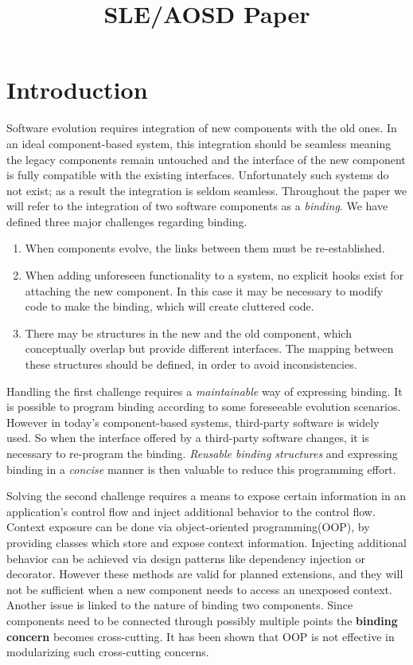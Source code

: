 \documentclass{llncs}
\begin{document}
\title{SLE/AOSD Paper}
\maketitle
\section{Introduction}
Software evolution requires integration of new components with the old ones. In an
ideal component-based system, this integration should be seamless meaning 
 the legacy components remain untouched and the interface of the new component is fully compatible with the existing interfaces. 
Unfortunately such systems do not exist; as a result the integration is seldom
seamless.  Throughout the paper we will refer to the integration of two software components as a
\emph{binding}. We have defined three major challenges regarding binding. 

\begin{enumerate}
  	\item When components evolve, the links between them
	must be re-established. 
 	 \item When adding unforeseen functionality to a system, no explicit hooks
 	 exist for attaching the new component. In this case it may be necessary
  	to modify code to make the binding, which will create cluttered code. 
	\item There may be structures in the new and the old component, which
	conceptually overlap but provide different interfaces. 	The mapping between
	these structures should be defined, in order to avoid inconsistencies.
\end{enumerate}

Handling the first challenge requires a \emph{maintainable} way of expressing binding. It is possible to program binding according to some foreseeable evolution scenarios. However in today's component-based systems, third-party software is widely used. So when the interface offered by a third-party software changes, it is necessary to re-program the binding. \emph{Reusable binding structures} and expressing binding in a \emph{concise} manner is then valuable to reduce this programming effort.

Solving the second challenge requires a means to expose certain information in an
application's control flow and inject additional behavior to the control flow. Context exposure can be done via object-oriented programming(OOP), by providing classes which store and expose context information. Injecting additional behavior can be achieved via design patterns like dependency injection or decorator. However these methods are valid for planned extensions, and they will not be sufficient when a new component needs to access an unexposed context. Another issue is linked to the nature of binding two components. Since components need to be connected through possibly multiple points the \textbf{binding concern} becomes cross-cutting. It has been shown that OOP is not effective in modularizing such cross-cutting concerns.  
\end{document}

